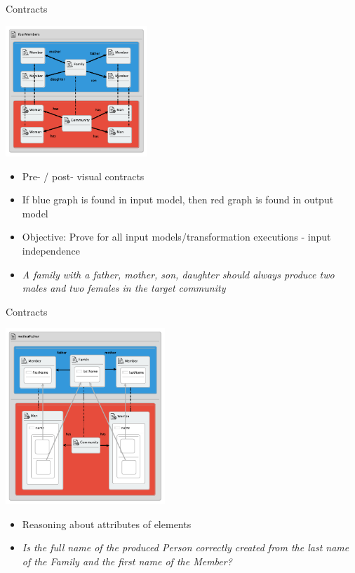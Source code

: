 \documentclass[xcolor=dvipsnames, 12pt, handout]{beamer}
\begin{document}
\begin{frame}{Contracts}
\begin{center}
\includegraphics[width=0.40\textwidth]{figures/fourMembersProp}
\end{center}
\pause
\begin{itemize}[<+->]
\item Pre- / post- visual contracts
\item If blue graph is found in input model, then red graph is found in output model
\item Objective: Prove for all input models/transformation executions - input independence
\item \textit{A family with a father, mother, son, daughter
should always produce two males and two females in the
target community}
\end{itemize}
\end{frame}


\begin{frame}{Contracts}
\begin{center}
\includegraphics[width=0.45\textwidth]{figures/motherFatherProp}
\end{center}
\pause
\begin{itemize}[<+->]
\item Reasoning about attributes of elements
\item \textit{Is the full name of the produced Person correctly created from the last name of the Family and the first name of the Member?}
\end{itemize}
\end{frame}
\end{document}
